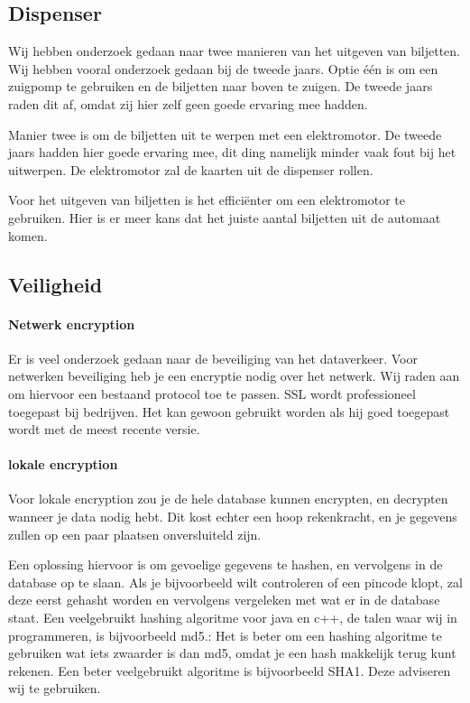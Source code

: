 \documentclass{article}
\begin{document}
\subsection{Dispenser}

Wij hebben onderzoek gedaan naar twee manieren van het uitgeven van biljetten.
Wij hebben vooral onderzoek gedaan bij de tweede jaars.
Optie \'e\'en is om een zuigpomp te gebruiken en de biljetten naar boven te zuigen.
De tweede jaars raden dit af, omdat zij hier zelf geen goede ervaring mee hadden.

Manier twee is om de biljetten uit te werpen met een elektromotor.
De tweede jaars hadden hier goede ervaring mee, dit ding namelijk minder vaak fout bij het uitwerpen.
De elektromotor zal de kaarten uit de dispenser rollen.

Voor het uitgeven van biljetten is het effici\"enter om een elektromotor te gebruiken.
Hier is er meer kans dat het juiste aantal biljetten uit de automaat komen.

\newpage

\subsection{Veiligheid}

\paragraph{Netwerk encryption}

Er is veel onderzoek gedaan naar de beveiliging van het dataverkeer.
Voor netwerken beveiliging heb je een encryptie nodig over het netwerk.
Wij raden aan om hiervoor een bestaand protocol toe te passen.
SSL wordt professioneel toegepast bij bedrijven.
Het kan gewoon gebruikt worden als hij goed toegepast wordt met de meest recente versie.

\paragraph{lokale encryption}

Voor lokale encryption zou je de hele database kunnen encrypten, en decrypten wanneer je data nodig hebt.
Dit kost echter een hoop rekenkracht, en je gegevens zullen op een paar plaatsen onversluiteld zijn.

Een oplossing hiervoor is om gevoelige gegevens te hashen, en vervolgens in de database op te slaan.
Als je bijvoorbeeld wilt controleren of een pincode klopt, zal deze eerst gehasht worden en vervolgens vergeleken met wat er in de database staat.
Een veelgebruikt hashing algoritme voor java en c++, de talen waar wij in programmeren, is bijvoorbeeld md5.:
Het is beter om een hashing algoritme te gebruiken wat iets zwaarder is dan md5, omdat je een hash makkelijk terug kunt rekenen.
Een beter veelgebruikt algoritme is bijvoorbeeld SHA1.
Deze adviseren wij te gebruiken.
\end{document}
